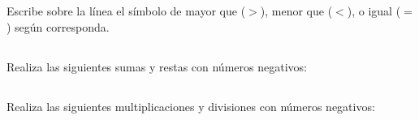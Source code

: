 \documentclass[12pt,addpoints]{evalua}
\begin{document}
\begin{questions}
      \subsection*{\else{}\fi}
      \question[4] Escribe sobre la línea el símbolo de mayor que ($>$), menor que ($<$), o igual ($=$) según corresponda.

      \begin{multicols}{2}
      \end{multicols}

      \subsection*{\else{}\fi}
      \question[4] Realiza las siguientes sumas y restas con números negativos:

      \begin{multicols}{2}
      \end{multicols}

      \subsection*{\else{}\fi}
      \question[4] Realiza las siguientes multiplicaciones y divisiones con números negativos:
      \begin{multicols}{2}
            \begin{parts}

\end{parts}
\end{multicols}
\end{questions}
\end{document}
